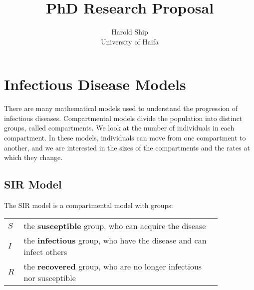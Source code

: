 \documentclass[11pt,a4paper,titlepage]{article}
\title{PhD Research Proposal}
\author{Harold Ship \\ University of Haifa}
\theoremstyle{definition}
\begin{document}

\maketitle \clearpage
\tableofcontents \clearpage
\iffalse %
\listoffigures \clearpage
\listoftables \clearpage
\fi
\printglossary[type=\acronymtype] \clearpage


\setcounter{page}{1}

%

\section{Infectious Disease Models}
\label{sec:infectious-disease-models}

There are many mathematical models used to understand the progression of infectious diseases.
Compartmental models divide the population into distinct groups,
called compartments.
We look at the number of individuals in each compartment.
In these models,
individuals can move from one compartment to another,
and we are interested in the sizes of the compartments and the rates at which they change.
\cite{bertsimas2014robust}

\subsection{SIR Model}
\label{subsec:infectious-disease-models:sir}

The SIR model is a compartmental model with groups:

\begin{tabular}{p{0.05\linewidth}p{0.8\linewidth}}
    $S$ & the \textbf{susceptible} group,%
    who can acquire the disease\\%
    $I$ & the \textbf{infectious} group,%
    who have the disease and can infect others\\%
    $R$ & the \textbf{recovered} group,%
    who are no longer infectious nor susceptible
\end{tabular}
\end{document}
